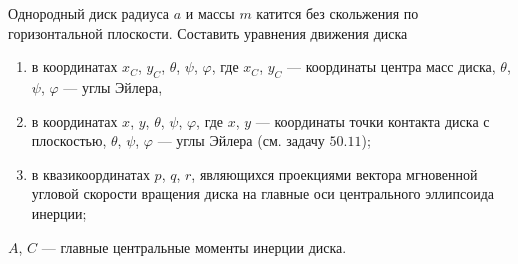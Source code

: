 Однородный диск радиуса $a$ и массы $m$ катится
без скольжения по горизонтальной плоскости.
Составить уравнения движения диска
\begin{enumerate}
\item в координатах $x_C$, $y_C$, $\theta$, $\psi$, $\varphi$,
где $x_C$, $y_C$ --- координаты центра масс диска,
$\theta$, $\psi$, $\varphi$ --- углы Эйлера,
\item в координатах $x$, $y$, $\theta$, $\psi$, $\varphi$, где $x$, $y$ ---
координаты точки контакта диска с плоскостью,
$\theta$, $\psi$, $\varphi$ --- углы Эйлера (см. задачу $50.11$);
\item в квазикоординатах $p$, $q$, $r$, являющихся проекциями вектора
мгновенной угловой скорости вращения диска на главные оси центрального
эллипсоида инерции;
\end{enumerate}
$A$, $C$ --- главные центральные моменты инерции диска.
